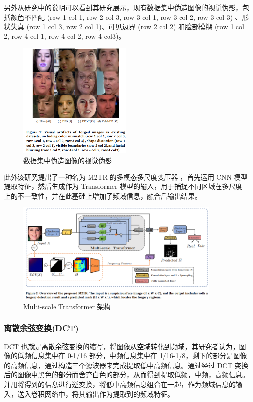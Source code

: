 另外从研究中的说明可以看到其研究展示，现有数据集中伪造图像的视觉伪影，包括颜色不匹配 (row 1 col 1, row 2 col 3,
row 3 col 1, row 3 col 2, row 3 col 3) 、形状失真 (row 1 col 3, row 2 col 1)、可见边界 (row 2 col 2) 和脸部模糊 (row 1 col 2, row 4 col 1, row 4 col 2, row 4 col3)。

\begin{figure}[htb]
\centering 
\includegraphics[width=0.50\textwidth]{img/p1m1.png} 
\caption{数据集中伪造图像的视觉伪影}
\label{Test}
\end{figure}

此外该研究提出了一种名为 M2TR 的多模态多尺度变压器 ，首先运用 CNN 模型提取特征，然后生成作为 Transformer 模型的输入，用于捕捉不同区域在多尺度上的不一致性，并在此基础上增加了频域信息，融合后输出结果。

\begin{figure}[htb]
\centering 
\includegraphics[width=0.90\textwidth]{img/p1m2.png} 
\caption{Multi-scale Transformer 架构}
\label{Test}
\end{figure}

\subsubsection{离散余弦变换(DCT)}

DCT 也就是离散余弦变换的缩写，将图像从空域转化到频域，其研究者认为，图像的低频信息集中在 0-1/16 部分，中频信息集中在 1/16-1/8，剩下的部分是图像的高频信息，通过构造三个滤波器来完成提取低中高频信息。通过经过 DCT 变换后的图像中黑色的部分而舍弃白色的部分，从而得到提取低频，中频，高频信息。并用将得到的信息进行逆变换，将低中高频信息组合在一起，作为频域信息的输入，送入卷积网络中，将其输出作为提取到的频域特征。

